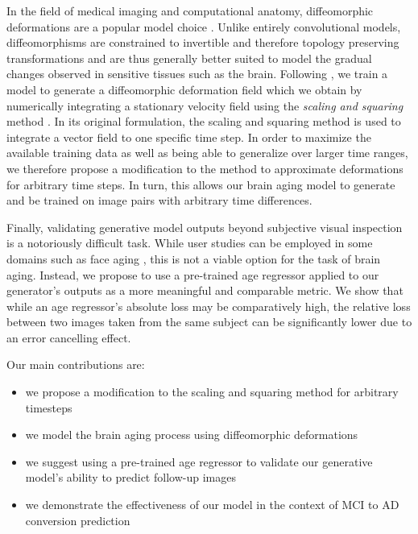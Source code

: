 In the field of medical imaging and computational anatomy, diffeomorphic deformations are a popular model choice \cite{beg2005computing} \cite{ashburner2007fast}. Unlike entirely convolutional models, diffeomorphisms are constrained to invertible and therefore topology preserving transformations and are thus generally better suited to model the gradual changes observed in sensitive tissues such as the brain. Following \cite{dalca2018unsupervised}, we train a model to generate a diffeomorphic deformation field which we obtain by numerically integrating a stationary velocity field using the \textit{scaling and squaring} method \cite{arsigny2006log}. In its original formulation, the scaling and squaring method is used to integrate a vector field to one specific time step. In order to maximize the available training data as well as being able to generalize over larger time ranges, we therefore propose a modification to the method to approximate deformations for arbitrary time steps. In turn, this allows our brain aging model to generate and be trained on image pairs with arbitrary time differences. 

Finally, validating generative model outputs beyond subjective visual inspection is a notoriously difficult task. While user studies can be employed in some domains such as face aging \cite{palsson2018generative}, this is not a viable option for the task of brain aging. Instead, we propose to use a pre-trained age regressor applied to our generator's outputs as a more meaningful and comparable metric. We show that while an age regressor's absolute loss may be comparatively high, the relative loss between two images taken from the same subject can be significantly lower due to an error cancelling effect.

Our main contributions are:

\begin{itemize}
	\item we propose a modification to the scaling and squaring method for arbitrary timesteps
	\item we model the brain aging process using diffeomorphic deformations%
	\item we suggest using a pre-trained age regressor to validate our generative model's ability to predict follow-up images
	\item we demonstrate the effectiveness of our model in the context of MCI to AD conversion prediction
\end{itemize}

